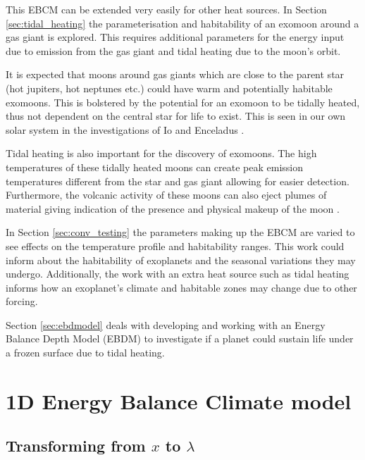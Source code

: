 \documentclass[12pt, onecolumn]{revtex4-2}    %
\begin{document}
This EBCM can be extended very easily for other heat sources.
In Section \ref{sec:tidal_heating} the parameterisation and habitability of an exomoon around a gas giant is explored.
This requires additional parameters for the energy input due to emission from the gas giant and tidal heating due to the moon's orbit.

It is expected that moons around gas giants which are close to the parent star (hot jupiters, hot neptunes etc.) could have warm and potentially habitable exomoons.
This is bolstered by the potential for an exomoon to be tidally heated, thus not dependent on the central star for life to exist.
This is seen in our own solar system in the investigations of Io and Enceladus \cite{SAB22}.

Tidal heating is also important for the discovery of exomoons.
The high temperatures of these tidally heated moons can create peak emission temperatures different from the star and gas giant allowing for easier detection.
Furthermore, the volcanic activity of these moons can also eject plumes of material giving indication of the presence and physical makeup of the moon \cite{RN21}.


In Section \ref{sec:conv_testing} the parameters making up the EBCM are varied to see effects on the temperature profile and habitability ranges.
This work could inform about the habitability of exoplanets and the seasonal variations they may undergo.
Additionally, the work with an extra heat source such as tidal heating informs how an exoplanet's climate and habitable zones may change due to other forcing.

Section \ref{sec:ebdmodel} deals with developing and working with an Energy Balance Depth Model (EBDM) to investigate if a planet could sustain life under a frozen surface due to tidal heating.





\section{1D Energy Balance Climate model} \label{sec:ebcmodel}

\subsection{Transforming from $x$ to $\lambda$} \label{ssec:transxlambda}
\end{document}

